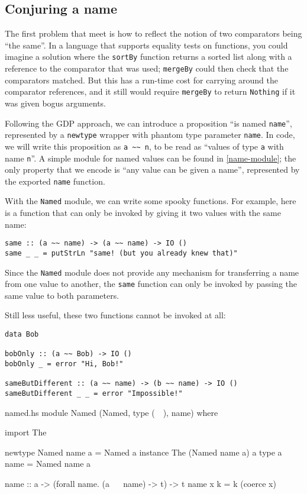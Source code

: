 \documentclass[format=sigplan, review=false, screen=true]{acmart}
\begin{document}
\subsection{Conjuring a name}
The first problem that meet is how to reflect the notion of two  comparators
being ``the same''. In a language that supports equality tests on functions,
you could imagine a solution where the \texttt{sortBy} function returns a sorted
list along with a reference to the comparator that was used; \texttt{mergeBy} could
then check that the comparators matched. But this has a run-time cost for carrying
around the comparator references, and it still would require \texttt{mergeBy} to
return \texttt{Nothing} if it was given bogus arguments.

Following the GDP approach, we can introduce a proposition ``is named \texttt{name}'',
represented by a \texttt{newtype} wrapper with phantom type parameter \texttt{name}.
In code, we will write this proposition as \verb|a ~~ n|, to be read as
``values of type \texttt{a} with name \texttt{n}''. A simple module for named values
can be found in \cref{name-module}; the only property that we encode is
``any value can be given a name'', represented by the exported \texttt{name} function.

With the \texttt{Named} module, we can write some spooky functions. For example,
here is a function that can only be invoked by giving it two values with the same
name:
\begin{verbatim}
same :: (a ~~ name) -> (a ~~ name) -> IO ()
same _ _ = putStrLn "same! (but you already knew that)"
\end{verbatim}
Since the \texttt{Named} module does not provide any mechanism for transferring
a name from one value to another, the \texttt{same} function can only be invoked
by passing the same value to both parameters.

Still less useful, these two functions cannot be invoked at all:
\begin{verbatim}
data Bob

bobOnly :: (a ~~ Bob) -> IO ()
bobOnly _ = error "Hi, Bob!"

sameButDifferent :: (a ~~ name) -> (b ~~ name) -> IO ()
sameButDifferent _ _ = error "Impossible!"
\end{verbatim}
\begin{filecontents*}{named.hs}
module Named (Named, type (~~), name) where

import The

newtype Named name a = Named a
instance The (Named name a) a
type a ~~ name = Named name a

name :: a -> (forall name. (a ~~ name) -> t) -> t
name x k = k (coerce x)
\end{filecontents*}
\end{document}
